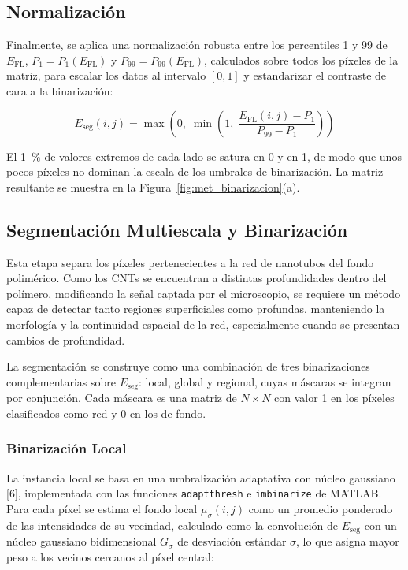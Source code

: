 \subsection{Normalización}
\label{sec:met_norm}

Finalmente, se aplica una normalización robusta entre los percentiles 1 y 99 de $E_{\mathrm{FL}}$, $P_1 = P_1(E_{\mathrm{FL}})$ y $P_{99} = P_{99}(E_{\mathrm{FL}})$, calculados sobre todos los píxeles de la matriz, para escalar los datos al intervalo $[0,1]$ y estandarizar el contraste de cara a la binarización:

\begin{equation}
E_{\mathrm{seg}}(i,j) = \max\left(0,\; \min\left(1,\; \frac{E_{\mathrm{FL}}(i,j) - P_{1}}{P_{99} - P_{1}}\right)\right)
\label{eq:norm}
\end{equation}

El 1~\% de valores extremos de cada lado se satura en 0 y en 1, de modo que unos pocos píxeles no dominan la escala de los umbrales de binarización. La matriz resultante se muestra en la Figura~\ref{fig:met_binarizacion}(a).

\subsection{Segmentación Multiescala y Binarización}
\label{sec:met_binarizacion}

Esta etapa separa los píxeles pertenecientes a la red de nanotubos del fondo polimérico. Como los CNTs se encuentran a distintas profundidades dentro del polímero, modificando la señal captada por el microscopio, se requiere un método capaz de detectar tanto regiones superficiales como profundas, manteniendo la morfología y la continuidad espacial de la red, especialmente cuando se presentan cambios de profundidad.

La segmentación se construye como una combinación de tres binarizaciones complementarias sobre $E_{\mathrm{seg}}$: local, global y regional, cuyas máscaras se integran por conjunción. Cada máscara es una matriz de $N\times N$ con valor 1 en los píxeles clasificados como red y 0 en los de fondo.

\subsubsection{Binarización Local}

La instancia local se basa en una umbralización adaptativa con núcleo gaussiano [6], implementada con las funciones \texttt{adaptthresh} e \texttt{imbinarize} de MATLAB. Para cada píxel se estima el fondo local $\mu_{\sigma}(i,j)$ como un promedio ponderado de las intensidades de su vecindad, calculado como la convolución de $E_{\mathrm{seg}}$ con un núcleo gaussiano bidimensional $G_\sigma$ de desviación estándar $\sigma$, lo que asigna mayor peso a los vecinos cercanos al píxel central:

